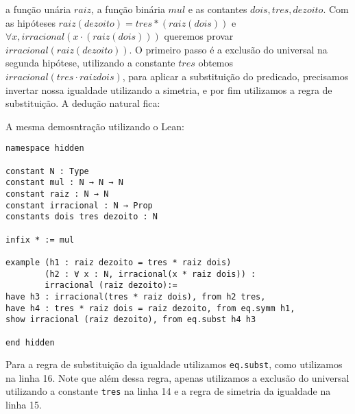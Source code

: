 a função unária $raiz$, a função binária $mul$ e as contantes $dois, tres, dezoito$. Com as hipóteses 
$raiz (dezoito) = tres*(raiz(dois))$ e $\forall x, irracional(x \cdot (raiz (dois)))$ queremos provar $irracional(raiz (dezoito))$. O primeiro
passo é a exclusão do universal na segunda hipótese, utilizando a constante $tres$ obtemos $irracional (tres \cdot raiz dois)$,
para aplicar a substituição do predicado, precisamos invertar nossa igualdade utilizando a simetria, e por 
fim utilizamos a regra de substituição. A dedução natural fica:
\begin{center}
    \begin{bprooftree}
    \end{bprooftree}
\end{center}
A mesma demosntração utilizando o Lean:
\begin{lstlisting}
namespace hidden

constant N : Type
constant mul : N → N → N
constant raiz : N → N
constant irracional : N → Prop
constants dois tres dezoito : N

infix * := mul

example (h1 : raiz dezoito = tres * raiz dois)
        (h2 : ∀ x : N, irracional(x * raiz dois)) :
        irracional (raiz dezoito):=
have h3 : irracional(tres * raiz dois), from h2 tres,
have h4 : tres * raiz dois = raiz dezoito, from eq.symm h1,
show irracional (raiz dezoito), from eq.subst h4 h3

end hidden
\end{lstlisting}
Para a regra de substituição da igualdade utilizamos \lstinline{eq.subst}, como utilizamos na linha 16.
Note que além dessa regra, apenas utilizamos a exclusão do universal utilizando a constante \lstinline{tres}
na linha 14 e a regra de simetria da igualdade na linha 15.